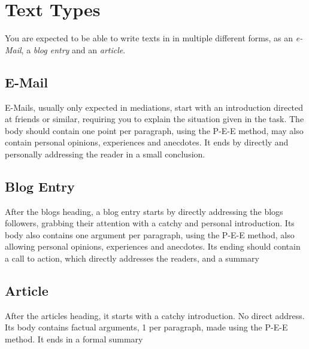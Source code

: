 \documentclass{article}
\begin{document}
\section{Text Types}
You are expected to be able to write texts in in multiple different forms, as an \emph{e-Mail}, a \emph{blog entry} and an \emph{article}.
 
\subsection{E-Mail}
E-Mails, usually only expected in mediations, start with an introduction directed at friends or similar, requiring you to explain the situation given in the task. The body should contain one point per paragraph, using the P-E-E method, may also contain personal opinions, experiences and anecdotes. It ends by directly and personally addressing the reader in a small conclusion.
 
\subsection{Blog Entry}
After the blogs heading, a blog entry starts by directly addressing the blogs followers, grabbing their attention with a catchy and personal introduction. Its body also contains one argument per paragraph, using the P-E-E method, also allowing personal opinions, experiences and anecdotes. Its ending should contain a call to action, which directly addresses the readers, and a summary
\subsection{Article}
After the articles heading, it starts with a catchy introduction. No direct address. Its body contains factual arguments, 1 per paragraph, made using the P-E-E method. It ends in a formal summary
 
\end{document}
